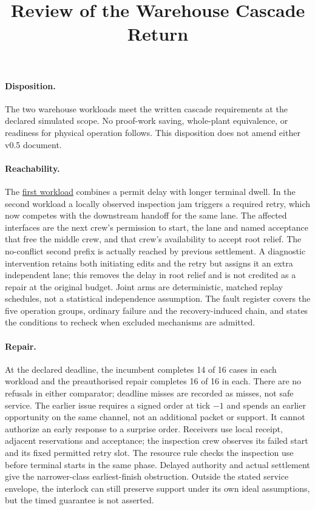 \documentclass[11pt]{article}
\title{Review of the Warehouse Cascade Return}
\date{}
\begin{document}
\maketitle
\paragraph{Disposition.} The two warehouse workloads meet the written
cascade requirements at the declared simulated scope. No proof-work
saving, whole-plant equivalence, or readiness for physical operation
follows. This disposition does not amend either v0.5 document.

\paragraph{Reachability.} The \href{https://github.com/eternal-november/eos-research-programmes/pull/356}{first workload} combines a
permit delay with longer terminal dwell. In the second workload a
locally observed inspection jam triggers a required retry, which now
competes with the downstream handoff for the same lane. The affected
interfaces are the next crew's permission to start, the lane and named
acceptance that free the middle crew, and that crew's availability to
accept root relief. The no-conflict second prefix is actually reached
by previous settlement. A diagnostic intervention retains both
initiating edits and the retry but assigns it an extra independent lane;
this removes the delay in root relief and is not credited as a repair
at the original budget. Joint arms are deterministic, matched replay
schedules, not a statistical independence assumption. The fault
register covers the five operation groups, ordinary failure and the
recovery-induced chain, and states the conditions to recheck when
excluded mechanisms are admitted.

\paragraph{Repair.} At the declared deadline, the incumbent completes
14 of 16 cases in each workload and the preauthorised repair completes
16 of 16 in each. There are no refusals in either comparator; deadline
misses are recorded as misses, not safe service. The earlier issue
requires a signed order at tick $-1$ and spends an earlier opportunity
on the same channel, not an additional packet or support. It cannot
authorize an early response to a surprise order. Receivers use local
receipt, adjacent reservations and acceptance; the inspection crew
observes its failed start and its fixed permitted retry slot. The
resource rule checks the inspection use before terminal starts in the
same phase. Delayed authority and actual settlement give the
narrower-class earliest-finish obstruction. Outside the stated service
envelope, the interlock can still preserve support under its own ideal
assumptions, but the timed guarantee is not asserted.
\end{document}
